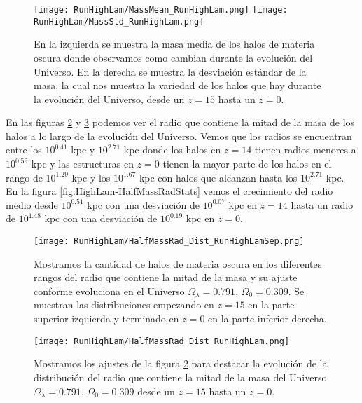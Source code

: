 \begin{figure}[H]
    \centering
    \texttt{[image: RunHighLam/MassMean\_RunHighLam.png]}
    \texttt{[image: RunHighLam/MassStd\_RunHighLam.png]}
    \caption[Media y desviación estándar de la distribución de masa]{\footnotesize En la izquierda se muestra la masa media de los halos de materia oscura donde observamos como cambian durante la evolución del Universo. En la derecha se muestra la desviación estándar de la masa, la cual nos muestra la variedad de los halos que hay durante la evolución del Universo, desde un $z=15$ hasta un $z=0$.}
    \label{fig:HighLam-MassStats}
\end{figure}

En las figuras \ref{fig:HighLam-HalfMassRadDistSep} y \ref{fig:HighLam-HalfMassRadDist} podemos ver el radio que contiene la mitad de la masa de los halos a lo largo de la evolución del Universo. Vemos que los radios se encuentran entre los $10^{0.41}$ kpc y $10^{2.71}$ kpc donde los halos en $z=14$ tienen radios menores a $10^{0.59}$ kpc y las estructuras en $z=0$ tienen la mayor parte de los halos en el rango de $10^{1.29}$ kpc y los $10^{1.67}$ kpc con halos que alcanzan hasta los $10^{2.71}$ kpc. En la figura \ref{fig:HighLam-HalfMassRadStats} vemos el crecimiento del radio medio desde $10^{0.51}$ kpc con una desviación de $10^{0.07}$ kpc en $z=14$ hasta un radio de $10^{1.48}$ kpc con una desviación de $10^{0.19}$ kpc en $z=0$.

\begin{figure}[H]
    \centering
    \texttt{[image: RunHighLam/HalfMassRad\_Dist\_RunHighLamSep.png]}
    \caption[Radio que contiene la mitad de la masa]{\footnotesize Mostramos la cantidad de halos de materia oscura en los diferentes rangos del radio que contiene la mitad de la masa y su ajuste conforme evoluciona en el Universo $\Omega_\lambda = 0.791$, $\Omega_0 = 0.309$. Se muestran las distribuciones empezando en $z=15$ en la parte superior izquierda y terminado en $z=0$ en la parte inferior derecha.}
    \label{fig:HighLam-HalfMassRadDistSep}
\end{figure}

\begin{figure}[H]
    \centering
    \texttt{[image: RunHighLam/HalfMassRad\_Dist\_RunHighLam.png]}
    \caption[Distribución del radio que contiene la mitad de la masa]{\footnotesize Mostramos los ajustes de la figura \ref{fig:HighLam-HalfMassRadDistSep} para destacar la evolución de la distribución del radio que contiene la mitad de la masa del Universo $\Omega_\lambda = 0.791$, $\Omega_0 = 0.309$ desde un $z=15$ hasta un $z=0$.}
    \label{fig:HighLam-HalfMassRadDist}
\end{figure}

